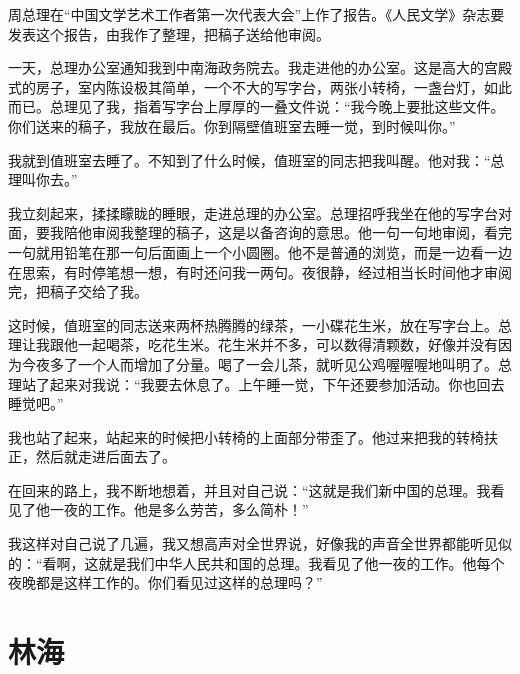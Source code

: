 \documentclass[12pt,UTF-8,openany]{ctexbook}
\begin{document}
\begin{large}
    
    周总理在“中国文学艺术工作者第一次代表大会”上作了报告。《人民文学》杂志要发表这个报告，由我作了整理，把稿子送给他审阅。
    
    一天，总理办公室通知我到中南海政务院去。我走进他的办公室。这是高大的宫殿式的房子，室内陈设极其简单，一个不大的写字台，两张小转椅，一盏台灯，如此而已。总理见了我，指着写字台上厚厚的一叠文件说：“我今晚上要批这些文件。你们送来的稿子，我放在最后。你到隔壁值班室去睡一觉，到时候叫你。”
    
    我就到值班室去睡了。不知到了什么时候，值班室的同志把我叫醒。他对我：“总理叫你去。”
    
    我立刻起来，揉揉矇眬的睡眼，走进总理的办公室。总理招呼我坐在他的写字台对面，要我陪他审阅我整理的稿子，这是以备咨询的意思。他一句一句地审阅，看完一句就用铅笔在那一句后面画上一个小圆圈。他不是普通的浏览，而是一边看一边在思索，有时停笔想一想，有时还问我一两句。夜很静，经过相当长时间他才审阅完，把稿子交给了我。
    
    这时候，值班室的同志送来两杯热腾腾的绿茶，一小碟花生米，放在写字台上。总理让我跟他一起喝茶，吃花生米。花生米并不多，可以数得清颗数，好像并没有因为今夜多了一个人而增加了分量。喝了一会儿茶，就听见公鸡喔喔喔地叫明了。总理站了起来对我说：“我要去休息了。上午睡一觉，下午还要参加活动。你也回去睡觉吧。”
    
    我也站了起来，站起来的时候把小转椅的上面部分带歪了。他过来把我的转椅扶正，然后就走进后面去了。
    
    在回来的路上，我不断地想着，并且对自己说：“这就是我们新中国的总理。我看见了他一夜的工作。他是多么劳苦，多么简朴！”
    
    我这样对自己说了几遍，我又想高声对全世界说，好像我的声音全世界都能听见似的：“看啊，这就是我们中华人民共和国的总理。我看见了他一夜的工作。他每个夜晚都是这样工作的。你们看见过这样的总理吗？”
    
\end{large}



\chapter{林海}
\end{document}
